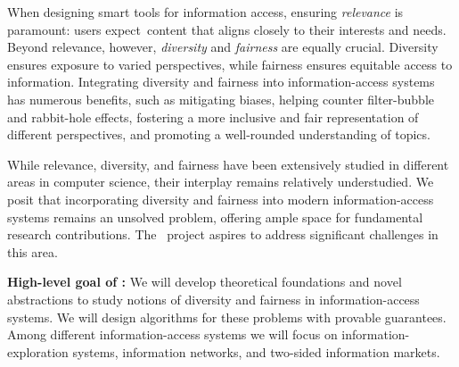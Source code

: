 \documentclass[a4paper,11pt]{article}
\begin{document}

When designing smart tools for information access, ensuring \emph{relevance} is paramount:
users expect~content that aligns closely to their interests and needs.
Beyond relevance, however, \emph{diversity} and \emph{fairness} are equally crucial.
Diversity ensures exposure to varied perspectives, 
while fairness ensures equitable access to information.
Integrating diversity and fairness into information-access systems has numerous benefits, 
such as mitigating biases, 
helping counter filter-bubble and rabbit-hole effects, 
fostering a more inclusive and fair representation of different perspectives, and 
promoting a well-rounded understanding of topics.

While relevance, diversity, and fairness
have been extensively studied in different areas in computer science, 
their interplay remains relatively understudied.
We posit that incorporating diversity and fairness into modern information-access systems
remains an unsolved problem, 
offering ample space for fundamental research contributions.
The \acronym\ project aspires to address
significant challenges in this area. 

\medskip
\noindent
\hspace{-3mm}\colorbox{verylightmagenta}{
\begin{minipage}{\textwidth}
{\bf High-level goal of \acronym:} 
We will develop theoretical foundations and novel abstractions to 
study notions of diversity and fairness in information-access systems.
We will design algorithms for these problems with provable guarantees.
Among different information-access systems we will focus on 
information-exploration systems, information networks, and two-sided information markets.
\end{minipage}}


\iffalse
\medskip
\noindent
\hspace{-3mm}\colorbox{verylightmagenta}{
\begin{minipage}{\textwidth}
{\bf Hypothesis:} 
We postulate that modern information-access systems suffer from lack of diversity 
and unfair representation of content. 
We hypothesize that such deficiencies can be mitigated by formulating novel abstractions
and designing rigorous computational methods to support individuals in 
maximizing diversity and improving fairness of the available content. 
\end{minipage}}
\fi
\end{document}
